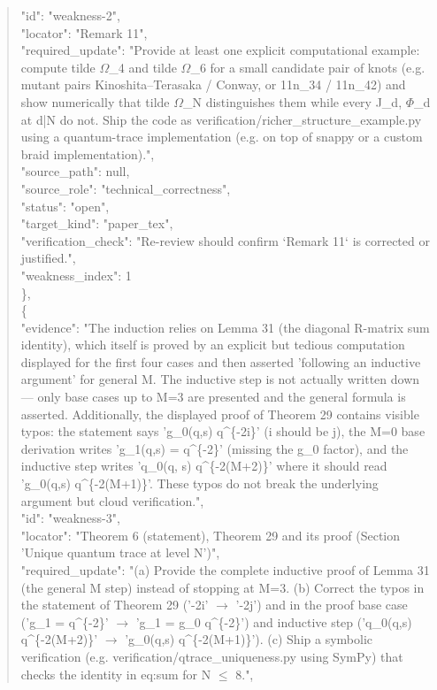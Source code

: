 \documentclass[11pt]{article}
\begin{document}
\begin{quote}
      "id": "weakness-2",\\
      "locator": "Remark 11",\\
      "required\_update": "Provide at least one explicit computational example: compute tilde \ensuremath{\Omega}\_4 and tilde \ensuremath{\Omega}\_6 for a small candidate pair of knots (e.g. mutant pairs Kinoshita--Terasaka / Conway, or 11n\_34 / 11n\_42) and show numerically that tilde \ensuremath{\Omega}\_N distinguishes them while every J\_d, \ensuremath{\Phi}\_d at d|N do not. Ship the code as verification/richer\_structure\_example.py using a quantum-trace implementation (e.g. on top of snappy or a custom braid implementation).",\\
      "source\_path": null,\\
      "source\_role": "technical\_correctness",\\
      "status": "open",\\
      "target\_kind": "paper\_tex",\\
      "verification\_check": "Re-review should confirm `Remark 11` is corrected or justified.",\\
      "weakness\_index": 1\\
    \},\\
    \{\\
      "evidence": "The induction relies on Lemma 31 (the diagonal R-matrix sum identity), which itself is proved by an explicit but tedious computation displayed for the first four cases and then asserted 'following an inductive argument' for general M. The inductive step is not actually written down --- only base cases up to M=3 are presented and the general formula is asserted. Additionally, the displayed proof of Theorem 29 contains visible typos: the statement says 'g\_0(q,s) q\^{}\{-2i\}' (i should be j), the M=0 base derivation writes 'g\_1(q,s) = q\^{}\{-2\}' (missing the g\_0 factor), and the inductive step writes 'q\_0(q, s) q\^{}\{-2(M+2)\}' where it should read 'g\_0(q,s) q\^{}\{-2(M+1)\}'. These typos do not break the underlying argument but cloud verification.",\\
      "id": "weakness-3",\\
      "locator": "Theorem 6 (statement), Theorem 29 and its proof (Section 'Unique quantum trace at level N')",\\
      "required\_update": "(a) Provide the complete inductive proof of Lemma 31 (the general M step) instead of stopping at M=3. (b) Correct the typos in the statement of Theorem 29 ('-2i' \ensuremath{\to} '-2j') and in the proof base case ('g\_1 = q\^{}\{-2\}' \ensuremath{\to} 'g\_1 = g\_0 q\^{}\{-2\}') and inductive step ('q\_0(q,s) q\^{}\{-2(M+2)\}' \ensuremath{\to} 'g\_0(q,s) q\^{}\{-2(M+1)\}'). (c) Ship a symbolic verification (e.g. verification/qtrace\_uniqueness.py using SymPy) that checks the identity in eq:sum for N \ensuremath{\le} 8.",\\

\end{quote}
\end{document}
